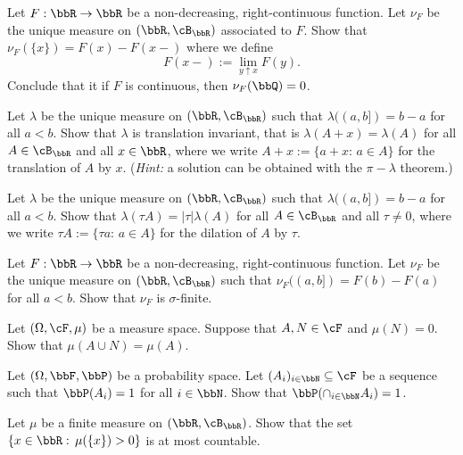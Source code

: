 \begin{problem}  Let $F:\bbR\to \bbR$ be a non-decreasing, right-continuous function. Let $\nu_F$ be the unique measure on $(\bbR,\cB_{\bbR})$ associated to $F$. Show that $\nu_F(\{x\}) = F(x)-F(x-)$ where we define 
    \begin{equation*}
        F(x-) := \lim_{y\uparrow x} F(y).
    \end{equation*} 
Conclude that it if $F$ is continuous, then $\nu_F(\bbQ) = 0$.
\end{problem}

\begin{problem} Let $\lambda$ be the unique measure on $(\bbR,\cB_{\bbR})$ such that $\lambda((a,b]) = b-a$ for all $a<b$. Show that $\lambda$ is translation invariant, that is $\lambda(A+x) = \lambda(A)$ for all $A\in \cB_{\bbR}$ and all $x\in \bbR$, where we write $A+x := \{a+x:\, a\in A\}$ for the translation of $A$ by $x$.
(\emph{Hint:} a solution can be obtained with the $\pi-\lambda$ theorem.)    
\end{problem}

\begin{problem} Let $\lambda$ be the unique measure on $(\bbR,\cB_{\bbR})$ such that $\lambda((a,b]) = b-a$ for all $a<b$. Show that $\lambda(\tau A) = |\tau|\lambda(A)$ for all $A\in \cB_{\bbR}$ and all $\tau\neq 0$, where we write $\tau A := \{\tau a:\, a\in A\}$ for the dilation of $A$ by $\tau$.
\end{problem}

\begin{problem}
    Let $F:\bbR\to \bbR$ be a non-decreasing, right-continuous function. Let $\nu_F$ be the unique measure on $(\bbR,\cB_{\bbR})$ such that $\nu_F((a,b]) = F(b)-F(a)$ for all $a<b$. Show that $\nu_F$ is $\sigma$-finite.
\end{problem}

\begin{problem}
    Let $(\Omega,\cF,\mu)$ be a measure space. Suppose that $A,N\in \cF$ and $\mu(N) =0$. Show that $\mu(A\cup N) = \mu(A)$.
\end{problem}

\begin{problem}
    Let $(\Omega,\bbF,\bbP)$ be a probability space. Let $(A_i)_{i\in \bbN}\subseteq \cF$ be a sequence such that $\bbP(A_i)=1$ for all $i\in\bbN$. Show that $\bbP(\cap_{i\in \bbN} A_i) = 1$.
\end{problem}

\begin{problem}
    Let $\mu$ be a finite measure on $(\bbR,\cB_{\bbR})$. Show that the set $\{x\in \bbR:\, \mu(\{x\})>0\}$ is at most countable.
\end{problem}

